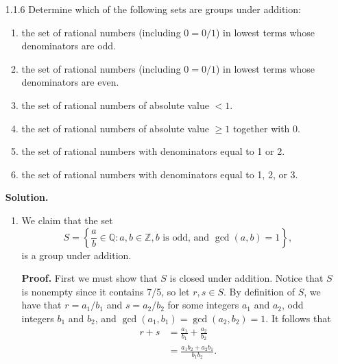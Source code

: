 \documentclass[9pt]{article}
\newcommand{\Z}{\mathbb{Z}}
\newcommand{\Q}{\mathbb{Q}}
\begin{document}
\begin{enumerate}
   \item[1.1.6]   Determine which of the following sets are groups under
                  addition:
                  \begin{enumerate}
                     \item the set of rational numbers (including $0 = 0/1$) in
                           lowest terms whose denominators are odd.
                     \item the set of rational numbers (including $0 = 0/1$) in
                           lowest terms whose denominators are even.
                     \item the set of rational numbers of absolute value $< 1$.
                     \item the set of rational numbers of absolute value $\ge 1$
                           together with 0.
                     \item the set of rational numbers with denominators equal
                           to 1 or 2.
                     \item the set of rational numbers with denominators equal
                           to 1, 2, or 3.
                  \end{enumerate}

      \textbf{Solution.}

      \begin{enumerate}
         \item We claim that the set
               $$S = \left\{\frac{a}{b} \in \Q : a, b \in \Z, b \text{ is odd,} 
                        \text{ and } \gcd(a, b) = 1\right\},$$
               is a group under addition.

               \textbf{Proof.} First we must show that $S$ is closed under 
               addition. Notice that $S$ is nonempty since it contains 7/5, so 
               let $r, s \in S$. By definition of $S$, we have that
               $r = a_1/b_1$ and $s = a_2/b_2$ for some integers $a_1$ and
               $a_2$, odd integers $b_1$ and $b_2$, and
               $\gcd(a_1, b_1) = \gcd(a_2, b_2) = 1$.
               It follows that
               \begin{align*}
                  r + s &= \frac{a_1}{b_1} + \frac{a_2}{b_2} \\
                        &= \frac{a_1b_2 + a_2b_1}{b_1b_2}.
               \end{align*}


\end{enumerate}
\end{enumerate}
\end{document}
